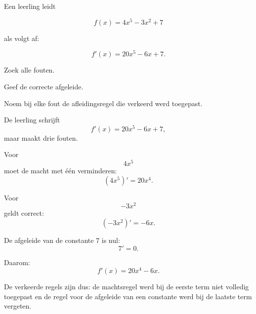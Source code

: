 \documentclass{ximera}
\begin{document}
\begin{oefening}[Foutenanalyse]{\oefU\ESS}

Een leerling leidt

\[
f(x)=4x^5-3x^2+7
\]

als volgt af:

\[
f'(x)=20x^5-6x+7.
\]

\begin{question}
Zoek alle fouten.
\end{question}

\begin{question}
Geef de correcte afgeleide.
\end{question}

\begin{question}
Noem bij elke fout de afleidingsregel die verkeerd werd toegepast.
\end{question}

\begin{oplossing}

De leerling schrijft
\[
f'(x)=20x^5-6x+7,
\]
maar maakt drie fouten.

Voor
\[
4x^5
\]
moet de macht met één verminderen:
\[
(4x^5)'=20x^4.
\]

Voor
\[
-3x^2
\]
geldt correct:
\[
(-3x^2)'=-6x.
\]

De afgeleide van de constante $7$ is nul:
\[
7'=0.
\]

Daarom:
\[
\boxed{f'(x)=20x^4-6x}.
\]

De verkeerde regels zijn dus: de machtsregel werd bij de eerste term niet
volledig toegepast en de regel voor de afgeleide van een constante werd bij
de laatste term vergeten.

\end{oplossing}

\end{oefening}


\end{document}
